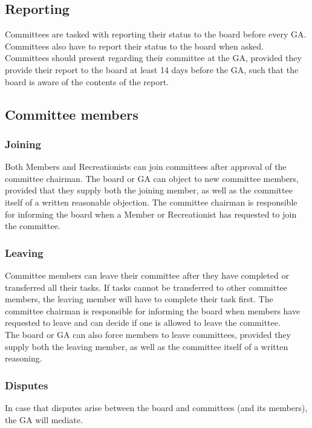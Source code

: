 \documentclass[a4paper]{article}
\begin{document}
\subsection{Reporting}
Committees are tasked with reporting their status to the board before every { GA}. Committees also have to report their status to the board when asked. Committees should present regarding their committee at the { GA}, provided they provide their report to the board at least 14 days before the { GA}, such that the board is aware of the contents of the report.

\subsection{Committee members}
\subsubsection{Joining}
Both { Members} and { Recreationists} can join committees after approval of the committee chairman. The board or { GA} can object to new committee members, provided that they supply both the joining member, as well as the committee itself of a written reasonable objection. The committee chairman is responsible for informing the board when a { Member} or { Recreationist} has requested to join the committee.

\subsubsection{Leaving}
Committee members can leave their committee after they have completed or transferred all their tasks. If tasks cannot be transferred to other committee members, the leaving member will have to complete their task first. The committee chairman is responsible for informing the board when members have requested to leave and can decide if one is allowed to leave the committee. \\ 

The board or { GA} can also force members to leave committees, provided they supply both the leaving member, as well as the committee itself of a written reasoning.

\subsubsection{Disputes}
In case that disputes arise between the board and committees (and its members), the { GA} will mediate.
\end{document}
